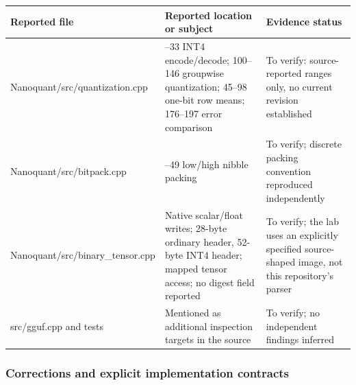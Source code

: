 {\def\LTcaptype{none} %
\begin{longtable}[]{@{}
  >{\raggedright\arraybackslash}p{}
  >{\raggedright\arraybackslash}p{}
  >{\raggedright\arraybackslash}p{}@{}}
\toprule\noalign{}
\begin{minipage}[b]{\linewidth}\raggedright
Reported file
\end{minipage} & \begin{minipage}[b]{\linewidth}\raggedright
Reported location or subject
\end{minipage} & \begin{minipage}[b]{\linewidth}\raggedright
Evidence status
\end{minipage} \\
\midrule\noalign{}
\endhead
\bottomrule\noalign{}
\endlastfoot
Nanoquant/src/quantization.cpp & 22--33 INT4 encode/decode; 100--146 groupwise quantization; 45--98 one-bit row means; 176--197 error comparison & To verify: source-reported ranges only, no current revision established \\
Nanoquant/src/bitpack.cpp & 26--49 low/high nibble packing & To verify; discrete packing convention reproduced independently \\
Nanoquant/src/binary\_tensor.cpp & Native scalar/float writes; 28-byte ordinary header, 52-byte INT4 header; mapped tensor access; no digest field reported & To verify; the lab uses an explicitly specified source-shaped image, not this repository's parser \\
src/gguf.cpp and tests & Mentioned as additional inspection targets in the source & To verify; no independent findings inferred \\
\end{longtable}
}

\subsubsection{Corrections and explicit implementation contracts}\label{appendix-a103e7846d21-corrections-and-explicit-implementation-contracts}

\hypertarget{appendix-a103e7846d21-corrections-and-explicit-implementation-contracts}{}

